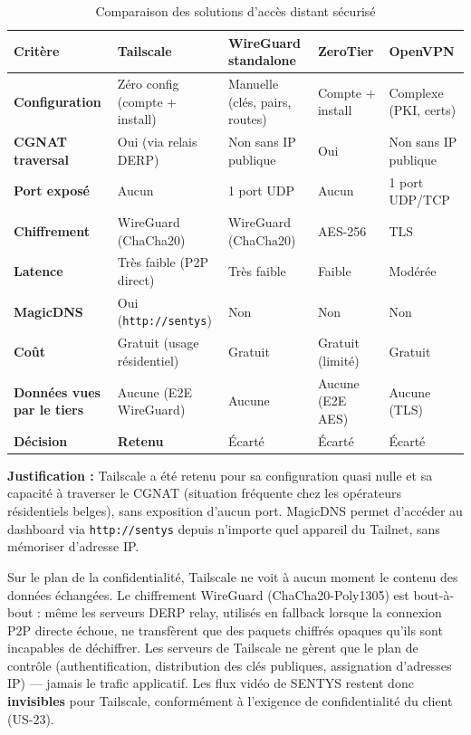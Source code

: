 \documentclass[12pt,a4paper]{article}
\begin{document}
\begin{table}[H]
\centering
\small
\renewcommand{\arraystretch}{1.3}
\begin{tabular}{|l|p{2.5cm}|p{2.5cm}|p{2.5cm}|p{2.5cm}|}
\hline
\textbf{Critère} & \textbf{Tailscale} & \textbf{WireGuard standalone} & \textbf{ZeroTier} & \textbf{OpenVPN} \\
\hline
\textbf{Configuration} & Zéro config (compte + install) & Manuelle (clés, pairs, routes) & Compte + install & Complexe (PKI, certs) \\
\hline
\textbf{CGNAT traversal} & Oui (via relais DERP) & Non sans IP publique & Oui & Non sans IP publique \\
\hline
\textbf{Port exposé} & Aucun & 1 port UDP & Aucun & 1 port UDP/TCP \\
\hline
\textbf{Chiffrement} & WireGuard (ChaCha20) & WireGuard (ChaCha20) & AES-256 & TLS \\
\hline
\textbf{Latence} & Très faible (P2P direct) & Très faible & Faible & Modérée \\
\hline
\textbf{MagicDNS} & Oui (\texttt{http://sentys}) & Non & Non & Non \\
\hline
\textbf{Coût} & Gratuit (usage résidentiel) & Gratuit & Gratuit (limité) & Gratuit \\
\hline
\textbf{Données vues par le tiers} & Aucune (E2E WireGuard) & Aucune & Aucune (E2E AES) & Aucune (TLS) \\
\hline
\textbf{Décision} & \textcolor{green!60!black}{\textbf{Retenu}} & Écarté & Écarté & Écarté \\
\hline
\end{tabular}
\caption{Comparaison des solutions d'accès distant sécurisé}
\end{table}

\begin{infobox}
\textbf{Justification :} Tailscale a été retenu pour sa configuration quasi nulle et sa capacité à traverser le CGNAT (situation fréquente chez les opérateurs résidentiels belges), sans exposition d'aucun port. MagicDNS permet d'accéder au dashboard via \texttt{http://sentys} depuis n'importe quel appareil du Tailnet, sans mémoriser d'adresse IP.

Sur le plan de la confidentialité, Tailscale ne voit à aucun moment le contenu des données échangées. Le chiffrement WireGuard (ChaCha20-Poly1305) est bout-à-bout : même les serveurs DERP relay, utilisés en fallback lorsque la connexion P2P directe échoue, ne transfèrent que des paquets chiffrés opaques qu'ils sont incapables de déchiffrer. Les serveurs de Tailscale ne gèrent que le plan de contrôle (authentification, distribution des clés publiques, assignation d'adresses IP) --- jamais le trafic applicatif. Les flux vidéo de SENTYS restent donc \textbf{invisibles} pour Tailscale, conformément à l'exigence de confidentialité du client (US-23).
\end{infobox}
\end{document}

